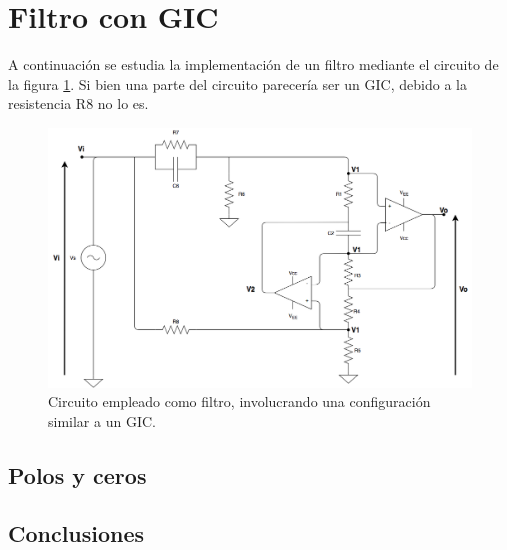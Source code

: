 
\section{Filtro con GIC}

A continuaci\'on se estudia la implementaci\'on de un filtro mediante el circuito de la figura \ref{circ1}. Si bien una parte del circuito parecer\'ia ser un GIC, debido a la resistencia R8 no lo es.

\begin{figure}[H] %
	\centering
	\includegraphics[scale=0.4]{../EJ1/circuito1.png}
	\caption{Circuito empleado como filtro, involucrando una configuraci\'on similar a un GIC.}
	\label{circ1}
\end{figure}




%

\subsection{Polos y ceros}







\subsection{Conclusiones}

